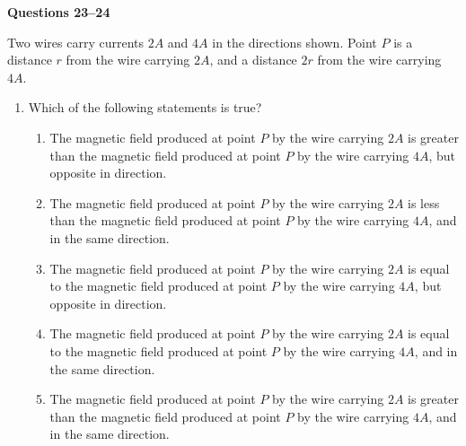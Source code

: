 \documentclass{../../../oss-apphys}
\begin{document}
\begin{multicols}{2}
\begin{enumerate}[leftmargin=18pt,resume]
  \end{enumerate}
  \textbf{Questions 23--24}
  
  Two wires carry currents $2A$ and $4A$ in the directions shown. Point $P$ is a
  distance $r$ from the wire carrying $2A$, and a distance $2r$ from the wire
  carrying $4A$.
  \begin{center}
  \end{center}
  \begin{enumerate}[leftmargin=18pt,resume]
  \item Which of the following statements is true?
    \begin{enumerate}[noitemsep,topsep=0pt,leftmargin=18pt,label=(\Alph*)]
    \item The magnetic field produced at point $P$ by the wire carrying $2A$ is
      greater than the magnetic field produced at point $P$ by the wire
      carrying $4A$, but opposite in direction.
    \item The magnetic field produced at point $P$ by the wire carrying $2A$ is
      less than the magnetic field produced at point $P$ by the wire
      carrying $4A$, and in the same direction.
    \item The magnetic field produced at point $P$ by the wire carrying $2A$ is
      equal to the magnetic field produced at point $P$ by the wire
      carrying $4A$, but opposite in direction.
    \item The magnetic field produced at point $P$ by the wire carrying $2A$ is
      equal to the magnetic field produced at point $P$ by the wire
      carrying $4A$, and in the same direction.
    \item The magnetic field produced at point $P$ by the wire carrying $2A$ is
      greater than the magnetic field produced at point $P$ by the wire
      carrying $4A$, and in the same direction.
    \end{enumerate}
    

\end{enumerate}
\end{multicols}
\end{document}
